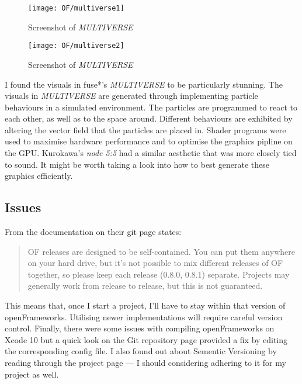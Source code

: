 \documentclass[../main_frameworkreview.tex]{subfiles}
\begin{document}
\begin{figure}
  \texttt{[image: OF/multiverse1]}
  \caption{Screenshot of \textit{MULTIVERSE}\cite{multiverse}}
  \texttt{[image: OF/multiverse2]}
  \caption{Screenshot of \textit{MULTIVERSE}\cite{multiverse}}
\end{figure}
I found the visuals in fuse*'s \textit{MULTIVERSE} to be particularly stunning. The visuals in \textit{MULTIVERSE} are generated through implementing particle behaviours in a simulated environment. The particles are programmed to react to each other, as well as to the space around. Different behaviours are exhibited by altering the vector field that the particles are placed in. Shader programs were used to maximise hardware performance and to optimise the graphics pipline on the GPU.\cite{multiverse} Kurokawa's \textit{node 5:5} had a similar aesthetic that was more closely tied to sound. It might be worth taking a look into how to best generate these graphics efficiently.

\subsection{Issues}
From the documentation on their git page states:

\begin{quote}
OF releases are designed to be self-contained. You can put them anywhere on your hard drive, but it's not possible to mix different releases of OF together, so please keep each release (0.8.0, 0.8.1) separate. Projects may generally work from release to release, but this is not guaranteed.\cite{OFgithub}
\end{quote}

This means that, once I start a project, I'll have to stay within that version of openFrameworks. Utilising newer implementations will require careful version control. Finally, there were some issues with compiling openFrameworks on Xcode 10 but a quick look on the Git repository page provided a fix by editing the corresponding config file.\cite{OFissue} I also found out about Sementic Versioning by reading through the project page --- I should considering adhering to it for my project as well.\cite{TomPrestonWerner}
\end{document}
